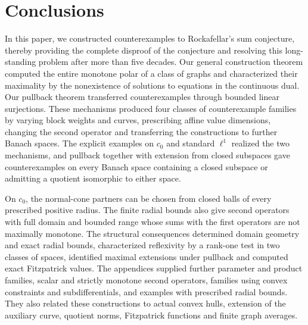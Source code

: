 \documentclass[11pt]{article}
\theoremstyle{definition}
\theoremstyle{remark}
\begin{document}
\section{Conclusions}
\label{sec:conclusion}



In this paper, we constructed counterexamples to Rockafellar's sum conjecture, thereby providing the complete disproof of the conjecture and resolving this long-standing problem after more than five decades. Our general construction theorem computed the entire monotone polar of a class of graphs and characterized their maximality by the nonexistence of solutions to equations in the continuous dual. Our pullback theorem transferred counterexamples through bounded linear surjections. These mechanisms produced four classes of counterexample families by varying block weights and curves, prescribing affine value dimensions, changing the second operator and transferring the constructions to further Banach spaces. The explicit examples on $c_0$ and standard $\ell^1$ realized the two mechanisms, and pullback together with extension from closed subspaces gave counterexamples on every Banach space containing a closed subspace or admitting a quotient isomorphic to either space.
 
On $c_0$, the normal-cone partners can be chosen from closed balls of every prescribed positive radius. The finite radial bounds also give second operators with full domain and bounded range whose sums with the first operators are not maximally monotone.
The structural consequences determined domain geometry and exact radial bounds, characterized reflexivity by a rank-one test in two classes of spaces, identified maximal extensions under pullback and computed exact Fitzpatrick values. The appendices supplied further parameter and product families, scalar and strictly monotone second operators, families using convex constraints and subdifferentials, and examples with prescribed radial bounds. They also related these constructions to actual convex hulls, extension of the auxiliary curve, quotient norms, Fitzpatrick functions and finite graph averages. 
\end{document}
